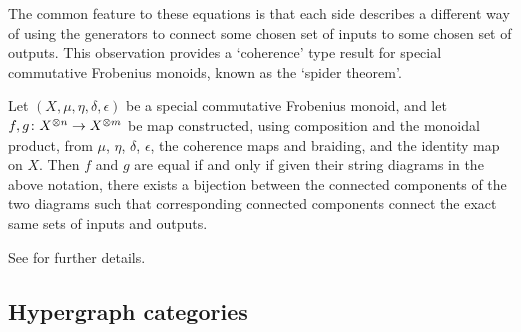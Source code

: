 The common feature to these equations is that each side describes a different
way of using the generators to connect some chosen set of inputs to some chosen
set of outputs. This observation provides a `coherence' type result for special
commutative Frobenius monoids, known as the `spider theorem'.
\begin{theorem}
  Let $(X,\mu,\eta,\delta,\epsilon)$ be a special commutative Frobenius monoid,
  and let $f,g{\colon} X^{\otimes n} \to X^{\otimes m}$ be map constructed, using
  composition and the monoidal product, from $\mu$, $\eta$, $\delta$, $\epsilon$, the
  coherence maps and braiding, and the identity map on $X$. Then $f$ and $g$ are
  equal if and only if given their string diagrams in the above notation, there
  exists a bijection between the connected components of the two diagrams such
  that corresponding connected components connect the exact same sets of inputs
  and outputs.
\end{theorem}
See \cite{Kis16,FonCoy16} for further details.

\subsection{Hypergraph categories}


